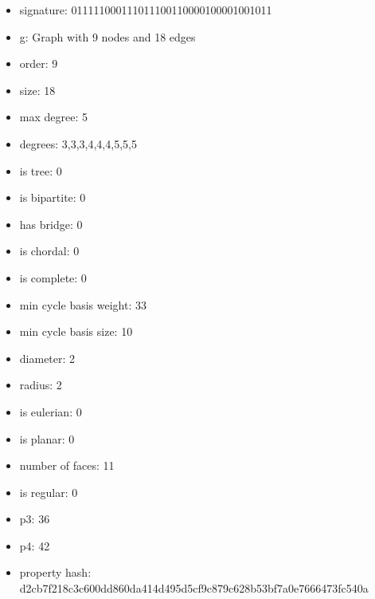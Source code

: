 \newpage
\begin{figure}
\end{figure}
\begin{itemize}
\item signature: 011111000111011100110000100001001011
\item g: Graph with 9 nodes and 18 edges
\item order: 9
\item size: 18
\item max degree: 5
\item degrees: 3,3,3,4,4,4,5,5,5
\item is tree: 0
\item is bipartite: 0
\item has bridge: 0
\item is chordal: 0
\item is complete: 0
\item min cycle basis weight: 33
\item min cycle basis size: 10
\item diameter: 2
\item radius: 2
\item is eulerian: 0
\item is planar: 0
\item number of faces: 11
\item is regular: 0
\item p3: 36
\item p4: 42
\item property hash: d2cb7f218c3c600dd860da414d495d5cf9c879c628b53bf7a0e7666473fc540a
\end{itemize}

